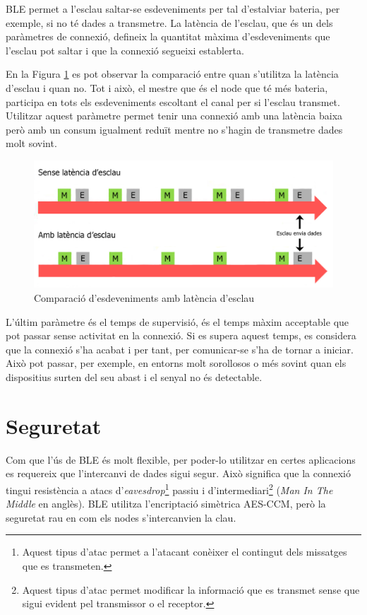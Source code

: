 BLE permet a l'esclau saltar-se esdeveniments per tal d'estalviar bateria, per exemple, si no té dades a transmetre.
La latència de l'esclau, que és un dels paràmetres de connexió, defineix la quantitat màxima d'esdeveniments que l'esclau pot saltar i que la connexió segueixi establerta.

En la Figura \ref{fig:slave_latency} es pot observar la comparació entre quan s'utilitza la latència d'esclau i quan no.
Tot i això, el mestre que és el node que té més bateria, participa en tots els esdeveniments escoltant el canal per si l'esclau transmet.
Utilitzar aquest paràmetre permet tenir una connexió amb una latència baixa però amb un consum igualment reduït mentre no s'hagin de transmetre dades molt sovint.

\begin{figure}[!h]
	\begin{center}
		\includegraphics{./images/slave_latency_new.jpeg}
		\caption{Comparació d'esdeveniments amb latència d'esclau \cite{slave_latency}}
		\label{fig:slave_latency}
	\end{center}
\end{figure}

L'últim paràmetre és el temps de supervisió, és el temps màxim acceptable que pot passar sense activitat en la connexió.
Si es supera aquest temps, es considera que la connexió s'ha acabat i per tant, per comunicar-se s'ha de tornar a iniciar.
Això pot passar, per exemple, en entorns molt sorollosos o més sovint quan els dispositius surten del seu abast i el senyal no és detectable.

\section{Seguretat}
\label{sec:security}
Com que l'ús de BLE és molt flexible, per poder-lo utilitzar en certes aplicacions es requereix que l'intercanvi de dades sigui segur.
Això significa que la connexió tingui resistència a atacs d'\textit{eavesdrop}\footnote{Aquest tipus d'atac permet a l'atacant conèixer el contingut dels missatges que es transmeten.} passiu i d'intermediari\footnote{Aquest tipus d'atac permet modificar la informació que es transmet sense que sigui evident pel transmissor o el receptor.} (\textit{Man In The Middle} en anglès).
BLE utilitza l'encriptació simètrica AES-CCM, però la seguretat rau en com els nodes s'intercanvien la clau.

